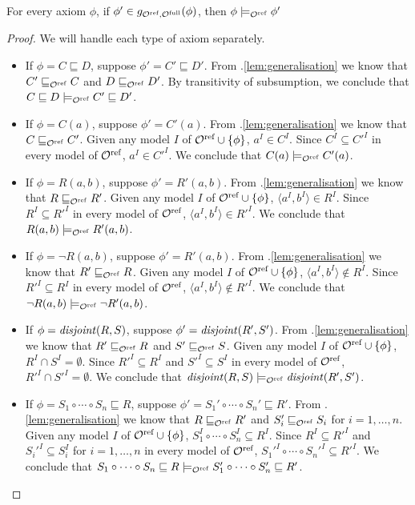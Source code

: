 \documentclass[
]{ceurart}
\begin{document}
\begin{lemma} \label{lem:weaker}
  For every \SROIQ axiom $\phi$, if $\phi' \in g_{{\mathcal{O}^\textnormal{ref}},{\mathcal{O}^\textnormal{full}}}(\phi)$, then $\phi \models_{\mathcal{O}^\textnormal{ref}} \phi'$
\end{lemma}

\begin{proof} We will handle each type of axiom separately.
  \begin{itemize}
    \item If $\phi = C \sqsubseteq D$, suppose $\phi' = C' \sqsubseteq D'$. From .\ref{lem:generalisation} we know that $C' \sqsubseteq_{\mathcal{O}^\textnormal{ref}} C$ and $D \sqsubseteq_{\mathcal{O}^\textnormal{ref}} D'$. By transitivity of subsumption, we conclude that $C \sqsubseteq D \models_{\mathcal{O}^\textnormal{ref}} C' \sqsubseteq D'$.
    \item If $\phi = C(a)$, suppose $\phi' = C'(a)$. From .\ref{lem:generalisation} we know that $C \sqsubseteq_{\mathcal{O}^\textnormal{ref}} C'$. Given any model $I$ of ${\mathcal{O}^\textnormal{ref}} \cup \{ \phi \}$, $a^I \in C^I$. Since $C^I \subseteq C'^I$ in every model of ${\mathcal{O}^\textnormal{ref}}$, $a^I \in C'^I$. We conclude that $C(a) \models_{\mathcal{O}^\textnormal{ref}} C'(a)$.
    \item If $\phi = R(a, b)$, suppose $\phi' = R'(a, b)$. From .\ref{lem:generalisation} we know that $R \sqsubseteq_{\mathcal{O}^\textnormal{ref}} R'$. Given any model $I$ of ${\mathcal{O}^\textnormal{ref}} \cup \{ \phi \}$, $\langle a^I, b^I \rangle \in R^I$. Since $R^I \subseteq R'^I$ in every model of ${\mathcal{O}^\textnormal{ref}}$, $\langle a^I, b^I \rangle \in R'^I$. We conclude that $R(a, b) \models_{\mathcal{O}^\textnormal{ref}} R'(a, b)$.
    \item If $\phi = \lnot R(a, b)$, suppose $\phi' = R'(a, b)$. From .\ref{lem:generalisation} we know that $R' \sqsubseteq_{\mathcal{O}^\textnormal{ref}} R$. Given any model $I$ of ${\mathcal{O}^\textnormal{ref}} \cup \{ \phi \}$, $\langle a^I, b^I \rangle \not\in R^I$. Since $R'^I \subseteq R^I$ in every model of ${\mathcal{O}^\textnormal{ref}}$, $\langle a^I, b^I \rangle \not\in R'^I$. We conclude that $\lnot R(a, b) \models_{\mathcal{O}^\textnormal{ref}} \lnot R'(a, b)$.
    \item If $\phi = \mathit{disjoint}(R, S)$, suppose $\phi' = \mathit{disjoint}(R', S')$. From .\ref{lem:generalisation} we know that $R' \sqsubseteq_{\mathcal{O}^\textnormal{ref}} R$ and $S' \sqsubseteq_{\mathcal{O}^\textnormal{ref}} S$. Given any model $I$ of ${\mathcal{O}^\textnormal{ref}} \cup \{ \phi \}$, $R^I \cap S^I = \emptyset$. Since $R'^I \subseteq R^I$ and $S'^I \subseteq S^I$ in every model of ${\mathcal{O}^\textnormal{ref}}$, $R'^I \cap S'^I = \emptyset$. We conclude that $\mathit{disjoint}(R, S) \models_{\mathcal{O}^\textnormal{ref}} \mathit{disjoint}(R', S')$.
    \item If $\phi = S_1 \circ \cdots \circ S_n \sqsubseteq R$, suppose $\phi' = S_1' \circ \cdots \circ S_n' \sqsubseteq R'$. From .\ref{lem:generalisation} we know that $R \sqsubseteq_{\mathcal{O}^\textnormal{ref}} R'$ and $S_i' \sqsubseteq_{\mathcal{O}^\textnormal{ref}} S_i$ for $i = 1, \dots, n$. Given any model $I$ of ${\mathcal{O}^\textnormal{ref}} \cup \{ \phi \}$, $S_1^I \circ \cdots \circ S_n^I \subseteq R^I$. Since $R^I \subseteq R'^I$ and $S_i'^I \subseteq S_i^I$ for $i = 1, \dots, n$ in every model of ${\mathcal{O}^\textnormal{ref}}$, $S_1'^I \circ \cdots \circ S_n'^I \subseteq R'^I$. We conclude that $S_1 \circ \cdots \circ S_n \sqsubseteq R \models_{\mathcal{O}^\textnormal{ref}} S_1' \circ \cdots \circ S_n' \sqsubseteq R'$.
  \end{itemize}
\end{proof}
\end{document}
